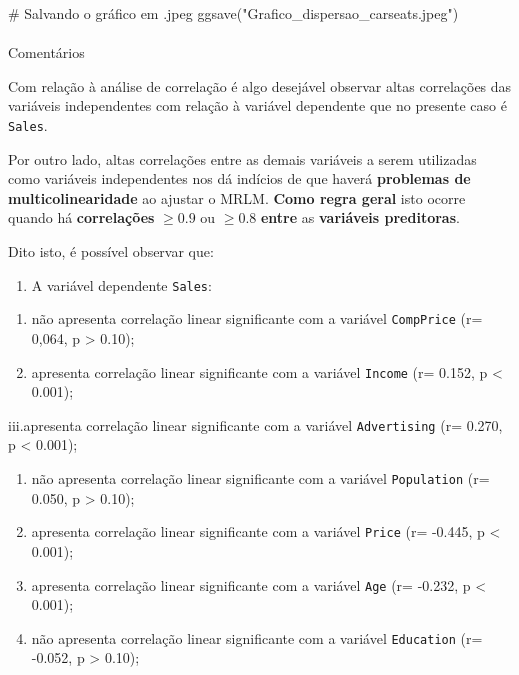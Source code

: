 \documentclass[
  letterpaper,
  DIV=11,
  numbers=noendperiod]{scrartcl}
\makeatletter
\let\oldparagraph\paragraph
\renewcommand{\paragraph}{
    \@ifstar
      \xxxParagraphStar
      \xxxParagraphNoStar
  }
\newcommand{\xxxParagraphStar}[1]{\oldparagraph*{#1}\mbox{}}
\newcommand{\xxxParagraphNoStar}[1]{\oldparagraph{#1}\mbox{}}
\newenvironment{Shaded}{\begin{snugshade}}{\end{snugshade}}
\newcommand{\CommentTok}[1]{\textcolor[rgb]{0.37,0.37,0.37}{#1}}
\newcommand{\FunctionTok}[1]{\textcolor[rgb]{0.28,0.35,0.67}{#1}}
\newcommand{\NormalTok}[1]{\textcolor[rgb]{0.00,0.23,0.31}{#1}}
\newcommand{\StringTok}[1]{\textcolor[rgb]{0.13,0.47,0.30}{#1}}
\providecommand{\tightlist}{%
  \setlength{\itemsep}{0pt}\setlength{\parskip}{0pt}}\usepackage{longtable,booktabs,array}
\makeatother
\begin{document}
\begin{Shaded}
\begin{Highlighting}[]
\CommentTok{\# Salvando o gráfico em .jpeg}
\FunctionTok{ggsave}\NormalTok{(}\StringTok{"Grafico\_dispersao\_carseats.jpeg"}\NormalTok{)}
\end{Highlighting}
\end{Shaded}

\paragraph{Comentários}\label{comentuxe1rios-1}

Com relação à análise de correlação é algo desejável observar altas
correlações das variáveis independentes com relação à variável
dependente que no presente caso é \texttt{Sales}.

Por outro lado, altas correlações entre as demais variáveis a serem
utilizadas como variáveis independentes nos dá indícios de que haverá
\textbf{problemas de multicolinearidade} ao ajustar o MRLM. \textbf{Como
regra geral} isto ocorre quando há \textbf{correlações} \(\geq 0.9\) ou
\(\geq 0.8\) \textbf{entre} as \textbf{variáveis preditoras}.

Dito isto, é possível observar que:

\begin{enumerate}
\def\labelenumi{\arabic{enumi})}
\tightlist
\item
  A variável dependente \texttt{Sales}:
\end{enumerate}

\begin{enumerate}
\def\labelenumi{\roman{enumi}.}
\item
  não apresenta correlação linear significante com a variável
  \texttt{CompPrice} (r= 0,064, p \textgreater{} 0.10);
\item
  apresenta correlação linear significante com a variável
  \texttt{Income} (r= 0.152, p \textless{} 0.001);
\end{enumerate}

iii.apresenta correlação linear significante com a variável
\texttt{Advertising} (r= 0.270, p \textless{} 0.001);

\begin{enumerate}
\def\labelenumi{\roman{enumi}.}
\setcounter{enumi}{3}
\item
  não apresenta correlação linear significante com a variável
  \texttt{Population} (r= 0.050, p \textgreater{} 0.10);
\item
  apresenta correlação linear significante com a variável \texttt{Price}
  (r= -0.445, p \textless{} 0.001);
\item
  apresenta correlação linear significante com a variável \texttt{Age}
  (r= -0.232, p \textless{} 0.001);
\item
  não apresenta correlação linear significante com a variável
  \texttt{Education} (r= -0.052, p \textgreater{} 0.10);
\end{enumerate}
\end{document}
